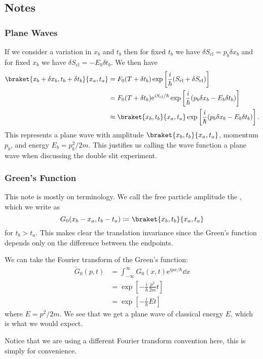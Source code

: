 \documentclass[fleqn]{NotesClass}
\newcommand*{\e}{\mathrm{e}}
\newcommand*{\cl}{\mathrm{cl}}
\begin{document}
    \subsection{Notes}
    \subsubsection{Plane Waves}
    If we consider a variation in \(x_b\) and \(t_b\) then for fixed \(t_b\) we have \(\delta S_{\cl} = p_b\delta x_b\) and for fixed \(x_b\) we have \(\delta S_{\cl} = -E_b\delta t_b\).
    We then have
    \begin{align}
        \braket{x_b + \delta x_b, t_b + \delta t_b}{x_a, t_a} &= F_0(T + \delta t_b) \exp\left[ \frac{i}{\hbar}(S_{\cl} + \delta S_{\cl}) \right]\\
        &= F_0(T + \delta t_b) \e^{iS_{\cl}/\hbar} \exp\left[ \frac{i}{\hbar} (p_b\delta x_b - E_b\delta t_b) \right]\\
        &\approx \braket{x_b, t_b}{x_a, t_a} \exp\left[ \frac{i}{\hbar} (p_b\delta x_b - E_b\delta t_b) \right].
    \end{align}
    This represents a plane wave with amplitude \(\braket{x_b, t_b}{x_a, t_a}\), momentum \(p_b\), and energy \(E_b = p_b^2/2m\).
    This justifies us calling the wave function a plane wave when discussing the double slit experiment.
    
    \subsubsection{Green's Function}\label{sec:green's function}
    This note is mostly on terminology.
    We call the free particle amplitude the , which we write as
    \begin{equation}
        G_0(x_b - x_a, t_b - t_a) \coloneqq \braket{x_b, t_b}{x_a, t_a}
    \end{equation}
    for \(t_b > t_a\).
    This makes clear the translation invariance since the Green's function depends only on the difference between the endpoints.
    
    We can take the Fourier transform of the Green's function:
    \begin{align}
        \tilde{G}_0(p, t) &= \int_{-\infty}^{\infty} G_0(x, t) \e^{ipx/\hbar} \dd{x}\\
        &= \exp\left[ -\frac{i}{\hbar} \frac{p^2}{2m}t \right]\\
        &= \exp\left[ -\frac{i}{\hbar} Et \right]
    \end{align}
    where \(E = p^2/2m\).
    We see that we get a plane wave of classical energy \(E\), which is what we would expect.
    \begin{wrn}
        Notice that we are using a different Fourier transform convention here, this is simply for convenience.
    \end{wrn}
    
\end{document}
